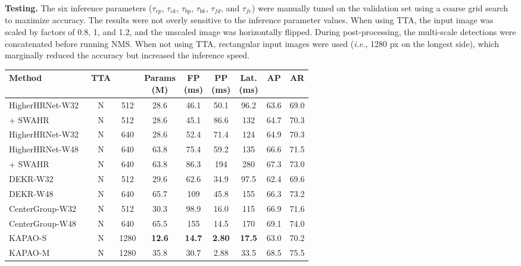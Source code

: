 \documentclass[runningheads]{llncs}
\newcommand{\ie}{\textit{i.e.}}
\newcommand\hll[1]{\bgroup
  \hskip0pt\color{black}#1\egroup
}
\newcommand\hlll[1]{\bgroup
  \hskip0pt\color{black}#1\egroup
}
\begin{document}
\medskip\noindent\textbf{Testing.} The six inference parameters ($\tau_{cp}$, $\tau_{ck}$, $\tau_{bp}$, $\tau_{bk}$, $\tau_{fd}$, and $\tau_{fc}$) were manually tuned on the validation set using a coarse grid search to maximize accuracy. The results were not overly sensitive to the inference parameter values. When using TTA, the input image was scaled by factors of 0.8, 1, and 1.2, and the unscaled image was horizontally flipped. During post-processing, the multi-scale detections \hlll{were} concatenated before running NMS. When not using TTA, rectangular input images were used (\ie, 1280 px on the longest side), which marginally reduced the accuracy but increased the inference speed. 

\begin{table}[t]
\footnotesize
\centering
\begin{tabular}{l|c|c|c|cc|c|c|c}
	\hline
	Method & TTA & \makecell{Input Size(s)} & \makecell{Params\\(M)} & \makecell{FP\\(ms)} & \makecell{PP\\(ms)} & \makecell{Lat.\\(ms)} & AP & AR\\
	\hline
	HigherHRNet-W32~\cite{cheng2020higherhrnet} & N & 512 & 28.6 & 46.1 & 50.1 & 96.2 & 63.6 & 69.0\\
	\hll{\quad + SWAHR~\cite{luo2021rethinking}} & N & 512 & 28.6 & 45.1 & 86.6 & 132 & 64.7 & 70.3\\
HigherHRNet-W32~\cite{cheng2020higherhrnet} & N & 640 & 28.6 & 52.4 & 71.4 & 124 & 64.9 & 70.3\\  HigherHRNet-W48~\cite{cheng2020higherhrnet} & N & 640 & 63.8 & 75.4 & 59.2 & 135 & 66.6 & 71.5\\
	\hll{\quad + SWAHR~\cite{luo2021rethinking}} & N & 640 & 63.8 & 86.3 & 194 & 280 & 67.3 & 73.0\\ 
DEKR-W32~\cite{geng2021bottom} & N & 512 & 29.6 & 62.6 & 34.9 & 97.5 & 62.4 & 69.6\\ 
	DEKR-W48~\cite{geng2021bottom} & N & 640 & 65.7 & 109 & 45.8 & 155 & 66.3 & 73.2\\
	\hll{CenterGroup-W32~\cite{braso2021center}} & N & 512 & 30.3 & 98.9 & 16.0 & 115 & 66.9 & 71.6\\
\hll{CenterGroup-W48~\cite{braso2021center}} & N & 640 & 65.5 & 155 & 14.5 & 170 & 69.1 & 74.0\\
KAPAO-S & N & 1280 & \textbf{12.6} & \textbf{14.7} & \textbf{2.80} & \textbf{17.5} & 63.0 & 70.2\\  KAPAO-M & N & 1280 & 35.8  & 30.7 & 2.88 & 33.5 & 68.5 & 75.5 \\ 

\end{tabular}
\end{table}
\end{document}
